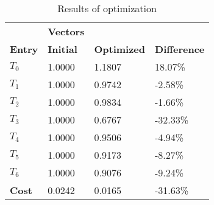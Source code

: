 \begin{table}[h!]
\centering
\begin{tabular}{llll}
\textbf{}      & \cellcolor[HTML]{EFEFEF}\textbf{Vectors} & \textbf{} & \textbf{}         \\
\rowcolor[HTML]{EFEFEF} 
\textbf{Entry} & \textbf{Initial} & \textbf{Optimized} & \textbf{Difference} \\
$T_0$ & 1.0000 & 1.1807 & 18.07\% \\ 
$T_1$ & 1.0000 & 0.9742 & -2.58\% \\ 
$T_2$ & 1.0000 & 0.9834 & -1.66\% \\ 
$T_3$ & 1.0000 & 0.6767 & -32.33\% \\ 
$T_4$ & 1.0000 & 0.9506 & -4.94\% \\ 
$T_5$ & 1.0000 & 0.9173 & -8.27\% \\ 
$T_6$ & 1.0000 & 0.9076 & -9.24\% \\ 
\rowcolor[HTML]{EFEFEF} 
\textbf{Cost}  & 0.0242 & 0.0165 & -31.63\% \\ 
\end{tabular}
\caption{Results of optimization}
\label{tab:OptimizationAnalysis}
\end{table}